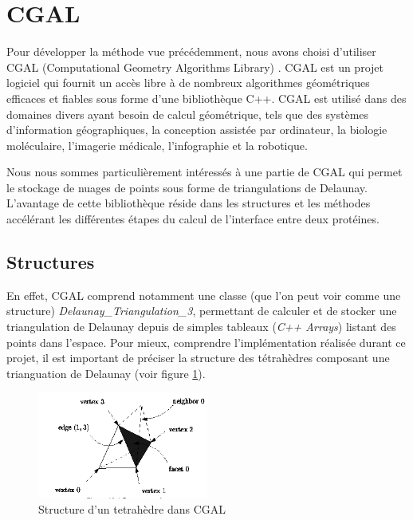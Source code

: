 \section{CGAL}

Pour développer la méthode vue précédemment, nous avons choisi d'utiliser CGAL
(Computational Geometry Algorithms Library) \cite{CGAL}.
CGAL est un projet logiciel qui fournit un accès libre à de nombreux algorithmes géométriques
efficaces et fiables sous forme d'une bibliothèque C++. CGAL est utilisé dans des
domaines divers ayant besoin de calcul géométrique, tels que des systèmes
d'information géographiques, la conception assistée par ordinateur, la biologie
moléculaire, l'imagerie médicale, l'infographie et la robotique.

Nous nous sommes particulièrement intéressés à une partie de CGAL qui permet le
stockage de nuages de points sous forme de triangulations de Delaunay. L'avantage
de cette bibliothèque réside dans les structures et les méthodes accélérant les différentes
étapes du calcul de l'interface entre deux protéines.

\subsection*{Structures}


En effet, CGAL comprend notamment une classe (que l'on peut voir comme une structure)
\textit{Delaunay\_Triangulation\_3},
permettant de calculer et de stocker une triangulation de Delaunay depuis de simples
tableaux (\textit{C++ Arrays}) listant des points dans l'espace. Pour mieux, comprendre
l'implémentation réalisée durant ce projet, il est important de préciser la structure des tétrahèdres
composant une trianguation de Delaunay (voir figure \ref{fig::tetrahedron_cgal}).

\begin{figure}[ht]
\centering
  \includegraphics[width=0.5\textwidth]{figures/tetrahedron_cgal.png}
  \caption{Structure d'un tetrahèdre dans CGAL \cite{CGAL}}
  \label{fig::tetrahedron_cgal}
\end{figure}

